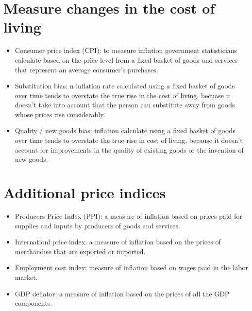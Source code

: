 \documentclass[openany]{book}
\begin{document}
\section{Measure changes in the cost of living}
\begin{itemize}
    \item Consumer price index (CPI): to measure inflation government statisticians calculate based on the price level from a fixed basket of goods and services that represent an average consumer's purchases. 
    \item Substitution bias: n inflation rate calculated using a fixed basket of goods over time tends to overstate the true rise in the cost of living, becuase it doesn't take into account that the person can substitute away from goods whose prices rise considerably. 
    \item Quality / new goods bias:  inflation calculate using a fixed basket of goods over time tends to overstate the true rise in cost of living, because it doesn't account for improvements in the quality of existing goods or the invention of new goods. 
\end{itemize}

\section{Additional price indices}
\begin{itemize}
    \item Producers Price Index (PPI): a measure of inflation based on prices paid for supplies and inputs by producers of goods and services. 
    \item Internationl price index: a measure of inflation based on the prices of merchandise that are exported or imported. 
    \item Employment cost index: measure of inflation based on wages paid in the labor market.
    \item GDP deflator: a measure of inflation based on the prices of all the GDP components. 
\end{itemize}


\end{document}
